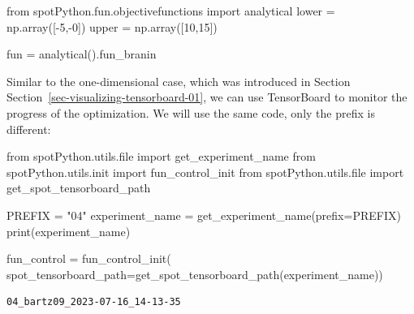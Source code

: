 \documentclass[
  letterpaper,
  DIV=11,
  numbers=noendperiod]{scrreprt}
\newenvironment{Shaded}{\begin{snugshade}}{\end{snugshade}}
\newcommand{\BuiltInTok}[1]{\textcolor[rgb]{0.00,0.23,0.31}{#1}}
\newcommand{\DecValTok}[1]{\textcolor[rgb]{0.68,0.00,0.00}{#1}}
\newcommand{\ImportTok}[1]{\textcolor[rgb]{0.00,0.46,0.62}{#1}}
\newcommand{\NormalTok}[1]{\textcolor[rgb]{0.00,0.23,0.31}{#1}}
\newcommand{\OperatorTok}[1]{\textcolor[rgb]{0.37,0.37,0.37}{#1}}
\newcommand{\StringTok}[1]{\textcolor[rgb]{0.13,0.47,0.30}{#1}}
\begin{document}
\begin{Shaded}
\begin{Highlighting}[]
\ImportTok{from}\NormalTok{ spotPython.fun.objectivefunctions }\ImportTok{import}\NormalTok{ analytical}
\NormalTok{lower }\OperatorTok{=}\NormalTok{ np.array([}\OperatorTok{{-}}\DecValTok{5}\NormalTok{,}\OperatorTok{{-}}\DecValTok{0}\NormalTok{])}
\NormalTok{upper }\OperatorTok{=}\NormalTok{ np.array([}\DecValTok{10}\NormalTok{,}\DecValTok{15}\NormalTok{])}
\end{Highlighting}
\end{Shaded}

\begin{Shaded}
\begin{Highlighting}[]
\NormalTok{fun }\OperatorTok{=}\NormalTok{ analytical().fun\_branin}
\end{Highlighting}
\end{Shaded}

\begin{tcolorbox}[enhanced jigsaw, titlerule=0mm, colbacktitle=quarto-callout-note-color!10!white, coltitle=black, arc=.35mm, toptitle=1mm, colback=white, left=2mm, opacityback=0, bottomtitle=1mm, bottomrule=.15mm, breakable, opacitybacktitle=0.6, colframe=quarto-callout-note-color-frame, rightrule=.15mm, toprule=.15mm, leftrule=.75mm, title=\textcolor{quarto-callout-note-color}{\faInfo}\hspace{0.5em}{TensorBoard}]

Similar to the one-dimensional case, which was introduced in Section
Section~\ref{sec-visualizing-tensorboard-01}, we can use TensorBoard to
monitor the progress of the optimization. We will use the same code,
only the prefix is different:

\begin{Shaded}
\begin{Highlighting}[]
\ImportTok{from}\NormalTok{ spotPython.utils.}\BuiltInTok{file} \ImportTok{import}\NormalTok{ get\_experiment\_name}
\ImportTok{from}\NormalTok{ spotPython.utils.init }\ImportTok{import}\NormalTok{ fun\_control\_init}
\ImportTok{from}\NormalTok{ spotPython.utils.}\BuiltInTok{file} \ImportTok{import}\NormalTok{ get\_spot\_tensorboard\_path}

\NormalTok{PREFIX }\OperatorTok{=} \StringTok{"04"}
\NormalTok{experiment\_name }\OperatorTok{=}\NormalTok{ get\_experiment\_name(prefix}\OperatorTok{=}\NormalTok{PREFIX)}
\BuiltInTok{print}\NormalTok{(experiment\_name)}

\NormalTok{fun\_control }\OperatorTok{=}\NormalTok{ fun\_control\_init(}
\NormalTok{    spot\_tensorboard\_path}\OperatorTok{=}\NormalTok{get\_spot\_tensorboard\_path(experiment\_name))}
\end{Highlighting}
\end{Shaded}

\begin{verbatim}
04_bartz09_2023-07-16_14-13-35
\end{verbatim}

\end{tcolorbox}
\end{document}
